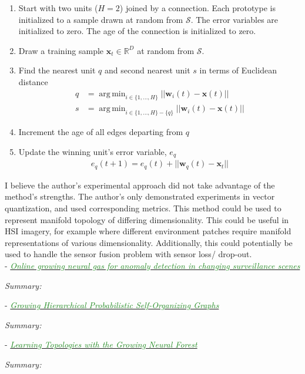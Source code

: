 \documentclass[]{article}
\DeclareMathOperator*{\argmin}{arg\,min}
\newcommand{\paperentry}[4]{
            \hangindent=1cm
            \cite{#1} - \href{run:../References/#3}{\textcolor{ForestGreen}{\textit{#2}}}
            
            \noindent            
            \begin{minipage}[t]{0.1\linewidth}\hfill\end{minipage}
            \begin{minipage}[t]{0.8\linewidth}\textcolor{NavyBlue}{{\textit{Summary:}}}#4\end{minipage}
            \vspace{.25cm}
          }
\begin{document}
	\begin{enumerate}
		\item Start with two units ($H=2$) joined by a connection.  Each prototype is initialized to a sample drawn at random from $\mathcal{S}$.  The error variables are initialized to zero.  The age of the connection is initialized to zero.
		\item Draw a training sample $\bm{x}_{t} \in \mathbb{R}^{D}$ at random from $\mathcal{S}$.
		\item Find the nearest unit $q$ and second nearest unit $s$ in terms of Euclidean distance
		\begin{align*}	
		q &= \argmin_{i\in \{1,\dots,H \}} ||\bm{w}_{i}(t) - \bm{x}(t)  || \\
		s &= \argmin_{i\in \{1,\dots,H \} - \{q\} } ||\bm{w}_{i}(t) - \bm{x}(t)  ||
		\end{align*}
		\item Increment the age of all edges departing from $q$
		\item  Update the winning unit's error variable, $e_{q}$
		\begin{align*}
		e_{q}(t+1) = e_{q}(t) + || \bm{w}_q(t) - \bm{x}_{t} ||
		\end{align*}
	\end{enumerate}

	\noindent
	I believe the author's experimental approach did not take advantage of the method's strengths.  The author's only demonstrated experiments in vector quantization, and used corresponding metrics.  This method could be used to represent manifold  topology of differing dimensionality. This could be useful in HSI imagery, for example where different environment patches require manifold representations of various dimensionality.  Additionally, this could potentially be used to handle the sensor fusion problem with sensor loss/ drop-out. \\
	
	\paperentry{Sun2016GNGMotionDetection}
	{Online growing neural gas for anomaly detection in changing surveillance scenes}
	{Manifold_Representation_Learning/CHL/Sun2016GNGMotionDetection.pdf}
	{}
	
	\paperentry{LopezRubio2011GHPGraphs}
	{Growing Hierarchical Probabilistic Self-Organizing Graphs}
	{Manifold_Representation_Learning/CHL/LopezRubio2011GHPGraphs.pdf}
	{}
	
	
	\paperentry{Palomo2016GrowingNeuralForest}
	{Learning Topologies with the Growing Neural Forest}
	{Manifold_Representation_Learning/CHL/Palomo2016GrowingNeuralForest.pdf}
	{}
	
\end{document}
